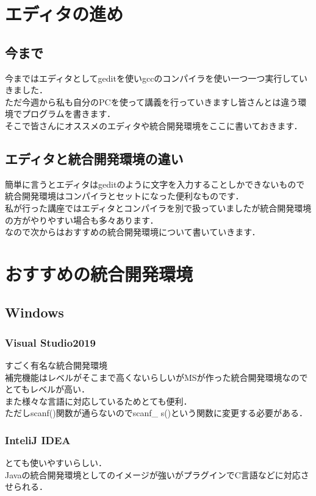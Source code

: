 \section{エディタの進め}
\subsection{今まで}
今まではエディタとしてgeditを使いgccのコンパイラを使い一つ一つ実行していきました．\\
ただ今週から私も自分のPCを使って講義を行っていきますし皆さんとは違う環境でプログラムを書きます．\\
そこで皆さんにオススメのエディタや統合開発環境をここに書いておきます．\\
\subsection{エディタと統合開発環境の違い}
簡単に言うとエディタはgeditのように文字を入力することしかできないもので統合開発環境はコンパイラとセットになった便利なものです．\\
私が行った講座ではエディタとコンパイラを別で扱っていましたが統合開発環境の方がやりやすい場合も多々あります．\\
なので次からはおすすめの統合開発環境について書いていきます．
\section{おすすめの統合開発環境}
\subsection{Windows}
\subsubsection{Visual Studio2019}
すごく有名な統合開発環境\\
補完機能はレベルがそこまで高くないらしいがMSが作った統合開発環境なのでとてもレベルが高い．\\
また様々な言語に対応しているためとても便利．\\
ただしscanf()関数が通らないのでscanf\_ s()という関数に変更する必要がある．\\
\subsubsection{InteliJ IDEA}
とても使いやすいらしい．\\
Javaの統合開発環境としてのイメージが強いがプラグインでC言語などに対応させられる．\\
